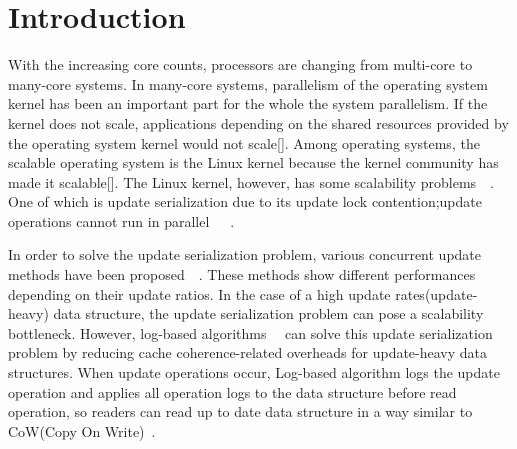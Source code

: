 \section{Introduction} \label{sec:introduction}

With the increasing core counts, processors are changing from multi-core to
many-core systems.
In many-core systems, parallelism of the operating system kernel has been an
important part for the whole the system parallelism.
If the kernel does not scale, applications depending on the shared
resources provided by the operating system kernel would not scale[].
Among operating systems, the scalable operating system is the Linux kernel
because the kernel community has made it scalable[].
The Linux kernel, however, has some scalability
problems~\cite{SilasBoydWickizer2010LinuxScales48}~\cite{Changwoo2016UMSF}.
One of which is update serialization due to its update lock
contention;update operations cannot run in
parallel~\cite{mckenney2011parallel}~\cite{Matveev2015RLU}~\cite{Dodds2015SCT}.

In order to solve the update serialization problem, various concurrent update
methods have been proposed~\cite{Arbel2014ConcurrentRCU}~\cite{Matveev2015RLU}.
These methods show different performances depending on their update ratios.
In the case of a high update rates(update-heavy) data structure, the
update serialization problem can pose a scalability bottleneck.
However, log-based algorithms~\cite{Hendler2010FC}~\cite{SilasBoydWickizerPth}
can solve this update serialization problem by reducing cache coherence-related
overheads for update-heavy data structures.
When update operations occur, Log-based algorithm logs the update
operation and applies all operation logs to the data structure
before read operation, so readers can read up to date data structure in a way
similar to CoW(Copy On Write)~\cite{PaulDetailLWN}.

